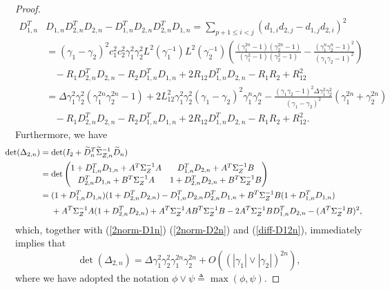 \documentclass[12pt]{article}
\begin{document}
\begin{proof}
\begin{equation}
\begin{aligned}
   D_{1,n}^T&D_{1,n}D_{2,n}^TD_{2,n}-D_{1,n}^TD_{2,n}D_{2,n}^TD_{1,n}=\sum_{p+1\le i<j}(d_{1,i}d_{2,j}-d_{1,j}d_{2,i})^2\\
   &=(\gamma_1-\gamma_2)^2c_1^2c_2^2\gamma_1^2\gamma_2^2L^2(\gamma_1^{-1})L^2(\gamma_2^{-1})\left(\frac{(\gamma_1^{2n}-1)(\gamma_2^{2n}-1)}{(\gamma_1^2-1)(\gamma_2^2-1)} - \frac{(\gamma_1^n\gamma_2^n-1)^2}{(\gamma_1\gamma_2-1)^2}  \right)\\[2pt]
   &~~~~-R_1 D^T_{2,n}D_{2,n}-R_2 D^T_{1,n}D_{1,n}+2R_{12}D^T_{1,n}D_{2,n}-R_1R_2+R^2_{12}\\
   &=\Delta \gamma_1^2\gamma_2^2(\gamma_1^{2n}\gamma_2^{2n}-1) + 2L^2_{12}\gamma_1^2\gamma_2^2(\gamma_1-\gamma_2)^2\gamma_1^n\gamma_2^n -\frac{(\gamma_1\gamma_2-1)^2\Delta \gamma_1^2\gamma_2^2}{(\gamma_1-\gamma_2)^2}(\gamma_1^{2n}+\gamma_2^{2n})\\[2pt]
   &~~~~-R_1 D^T_{2,n}D_{2,n}-R_2 D^T_{1,n}D_{1,n}+2R_{12}D^T_{1,n}D_{2,n}-R_1R_2+R^2_{12}.
\end{aligned}
\end{equation}
Furthermore, we have
\begin{equation}\label{det-sk2-1}
\hspace{-0.5cm}
\begin{aligned}
\det(\Delta_{2,n}) &= \det(I_2+\widetilde{D}_n^T\widetilde{\Sigma}_{Z,n}^{-1}\widetilde{D}_n)       \\
&= \det \begin{pmatrix}
   1+D_{1,n}^TD_{1,n} +A^T\Sigma_Z^{-1}A & D_{1,n}^TD_{2,n}+A^T\Sigma_Z^{-1}B\\[2pt] D_{2,n}^TD_{1,n} +B^T\Sigma_Z^{-1}A & 1+D_{2,n}^TD_{2,n}+B^T\Sigma_Z^{-1}B \end{pmatrix}\\
   &=(1+D_{1,n}^TD_{1,n})(1+D_{2,n}^TD_{2,n}) -D_{1,n}^TD_{2,n}D_{2,n}^TD_{1,n} +B^T\Sigma_Z^{-1}B(1+D^T_{1,n}D_{1,n}) \\[2pt]
   &~~~~+A^T\Sigma_Z^{-1}A(1+D^T_{2,n}D_{2,n}) +A^T\Sigma_Z^{-1}AB^T\Sigma_Z^{-1}B - 2A^T\Sigma_Z^{-1}BD^T_{1,n}D_{2,n}-(A^T\Sigma_Z^{-1}B)^2,
    \end{aligned}
\end{equation}
which, together with (\ref{2norm-D1n}) (\ref{2norm-D2n}) and (\ref{diff-D12n}), immediately implies that
\begin{equation}\label{det-sk2}
\det(\Delta_{2,n})= \Delta \gamma_1^2\gamma_2^2\gamma_1^{2n}\gamma_2^{2n} +O\left((|\gamma_1|\vee|\gamma_2|)^{2n}\right),
\end{equation}
where we have adopted the notation $\phi\vee \psi\triangleq \max(\phi,\psi)$.


\end{proof}
\end{document}
